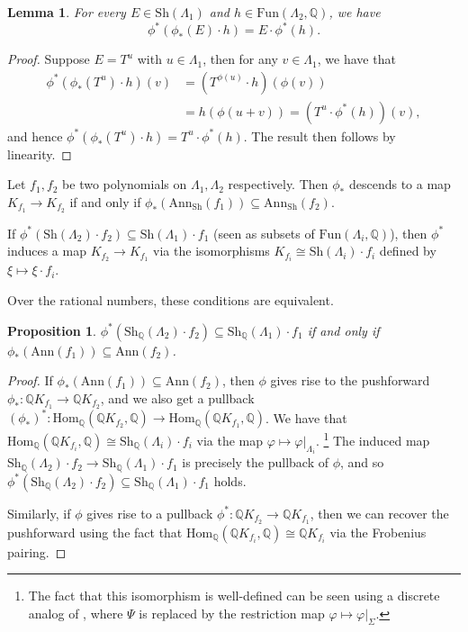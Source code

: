 \documentclass[oneside]{amsart}
\theoremstyle{plain}
\newtheorem{lemma}[theorem]{Lemma}
\newtheorem{proposition}[theorem]{Proposition}
\theoremstyle{definition}
\newcommand{\Q}{{\mathbb{Q}}}
\newcommand{\Ann}{{\mathrm{Ann}}}
\newcommand{\Fun}{{\mathrm{Fun}}}
\newcommand{\Hom}{{\mathrm{Hom}}}
\newcommand{\Sh}{{\mathrm{Sh}}}
\begin{document}
\begin{lemma}\label{lemma:pushforward-pullback-relation}
For every $E\in \Sh(\Lambda_1)$ and $h\in \Fun(\Lambda_2,\Q)$, we have
\[
    \phi^*(\phi_*(E)\cdot h) = E\cdot \phi^*(h).
\]
\end{lemma}

\begin{proof}
Suppose $E=T^u$ with $u \in \Lambda_1$, then for any $v\in \Lambda_1$, we have that
\begin{align*}
    \phi^*(\phi_*(T^u)\cdot h)(v) &= (T^{\phi(u)}\cdot h) (\phi(v))\\
    &= h(\phi(u + v)) = (T^u \cdot \phi^*(h))(v),
\end{align*}
and hence $\phi^*(\phi_*(T^u)\cdot h) = T^u\cdot \phi^*(h)$.
The result then follows by linearity.
\end{proof}

Let $f_1, f_2$ be two polynomials on $\Lambda_1, \Lambda_2$ respectively.
Then $\phi_*$ descends to a map $K_{f_1} \to K_{f_2}$ if and only if $\phi_*(\Ann_\Sh(f_1)) \subseteq \Ann_\Sh(f_2)$.

If $\phi^*(\Sh(\Lambda_2)\cdot f_2) \subseteq \Sh(\Lambda_1) \cdot f_1$ (seen as subsets of $\Fun(\Lambda_i, \Q)$), then
$\phi^*$ induces a map $K_{f_2} \to K_{f_1}$ via the isomorphisms 
$K_{f_i} \cong \Sh(\Lambda_i) \cdot f_i$ defined by $\xi \mapsto \xi \cdot f_i$.

Over the rational numbers, these conditions are equivalent. 

\begin{proposition}\label{prop:pushforward-pullback-rational}
    $\phi^*(\Sh_\Q(\Lambda_2)\cdot f_2) \subseteq \Sh_\Q(\Lambda_1) \cdot f_1$ if and only if $\phi_*(\Ann(f_1)) \subseteq \Ann(f_2)$.
\end{proposition}
\begin{proof}
    If $\phi_*(\Ann(f_1)) \subseteq \Ann(f_2)$, then $\phi$ gives rise to the pushforward $\phi_*: \Q K_{f_1} \to \Q K_{f_2}$, and we also get a pullback $(\phi_*)^*: \Hom_\Q(\Q K_{f_2}, \Q) \to \Hom_\Q(\Q K_{f_1}, \Q)$. We have that $\Hom_\Q(\Q K_{f_i}, \Q) \cong \Sh_\Q(\Lambda_i) \cdot f_i$ via the map $\varphi \mapsto \varphi|_{\Lambda_i}$.
    \footnote{
    The fact that this isomorphism is well-defined can be seen using a discrete analog of , where $\Psi$ is replaced by the restriction map $\varphi \mapsto \varphi|_\Sigma$.
    }
    The induced map $\Sh_\Q(\Lambda_2) \cdot f_2 \to \Sh_\Q(\Lambda_1) \cdot f_1$ is precisely the pullback of $\phi$, and so $\phi^*(\Sh_\Q(\Lambda_2)\cdot f_2) \subseteq \Sh_\Q(\Lambda_1) \cdot f_1$ holds.
    
    Similarly, if $\phi$ gives rise to a pullback $\phi^*: \Q K_{f_2} \to \Q K_{f_1}$, then we can recover the pushforward using the fact that
    $\Hom_\Q(\Q K_{f_i}, \Q) \cong \Q K_{f_i}$ via the Frobenius pairing.
\end{proof}
\end{document}
